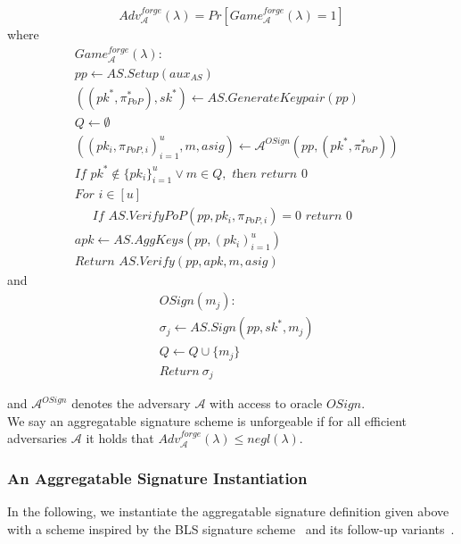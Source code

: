 \begin{definition}
$$\mathit{Adv}^{\mathit{forge}}_{\mathcal{A}}({\lambda}) = \mathit{Pr}[\mathit{Game}^{\mathit{forge}}_{\mathcal{A}}({\lambda}) =1]$$
\noindent where
\begin{align*}
&\mathit{Game}^{\mathit{forge}}_{\mathcal{A}}({\lambda}): \\
& \mathit{pp} \leftarrow \mathit{AS.Setup}(\mathit{aux_{\mathit{AS}}}) \\
& ((\mathit{pk}^*,\pi^*_{\mathit{PoP}}), \mathit{sk}^*) \leftarrow \mathit{AS.GenerateKeypair}(\mathit{pp})\\
& Q \leftarrow \emptyset \\
& ((\mathit{pk_i}, \pi_{\mathit{PoP},i})_{i=1}^{u}, m, \mathit{asig}) \leftarrow \mathcal{A}^{\mathit{OSign}}(\mathit{pp}, (\mathit{pk^*},\pi^*_{\mathit{PoP}})) \\
& \textit{If } \mathit{pk}^* \notin \{\mathit{pk_i}\}_{i=1}^{u} \vee m \in Q, \textit{ then return } 0 \\
& \textit{For } i \in [u] \\
& \ \ \ \ \ \textit{ If } \mathit{AS.VerifyPoP}(\mathit{pp}, \mathit{pk_i}, \pi_{\mathit{PoP},i})=0  \textit{ return } 0 \\
& \mathit{apk} \leftarrow \mathit{AS.AggKeys}(\mathit{pp}, (\mathit{pk_i})_{i=1}^{u}) \\
& \textit{Return } \mathit{AS.Verify}(\mathit{pp}, \mathit{apk}, m, \mathit{asig})
\end{align*}
\noindent and
\begin{align*}
& \mathit{OSign}(m_j): \\
& \sigma_j \leftarrow \mathit{AS.Sign}(\mathit{pp}, \mathit{sk}^*, m_j) \\
&  Q \leftarrow Q \cup \{m_j\} \\
& \textit{Return} \ \sigma_j
\end{align*}

\noindent and $\mathcal{A}^{\mathit{OSign}}$ denotes the adversary $\mathcal{A}$ with access to oracle $\mathit{OSign}$. \\

\noindent We say an aggregatable signature scheme is unforgeable if for all efficient adversaries
$\mathcal{A}$ it holds that $\mathit{Adv}^{\mathit{forge}}_{\mathcal{A}}({\lambda}) \leq \mathit{negl}(\lambda)$. 
\end{definition}

\subsubsection{An Aggregatable Signature Instantiation}
\label{sec:bls}
\noindent In the following, we instantiate the aggregatable signature definition given above with a scheme inspired by the BLS signature
scheme~\cite{BLS_signatures} and its follow-up variants~\cite{proofs_of_posession,boneh_compact_multisig}.

